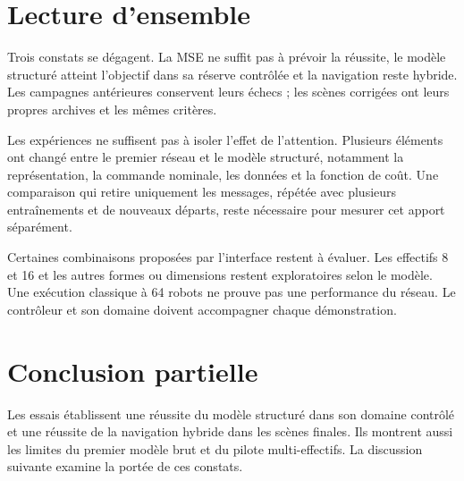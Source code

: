 \section{Lecture d'ensemble}
Trois constats se dégagent. La MSE ne suffit pas à prévoir la réussite, le modèle structuré atteint l'objectif dans sa réserve contrôlée et la navigation reste hybride. Les campagnes antérieures conservent leurs échecs ; les scènes corrigées ont leurs propres archives et les mêmes critères.

Les expériences ne suffisent pas à isoler l'effet de l'attention. Plusieurs éléments ont changé entre le premier réseau et le modèle structuré, notamment la représentation, la commande nominale, les données et la fonction de coût. Une comparaison qui retire uniquement les messages, répétée avec plusieurs entraînements et de nouveaux départs, reste nécessaire pour mesurer cet apport séparément.

Certaines combinaisons proposées par l'interface restent à évaluer. Les effectifs 8 et 16 et les autres formes ou dimensions restent exploratoires selon le modèle. Une exécution classique à 64 robots ne prouve pas une performance du réseau. Le contrôleur et son domaine doivent accompagner chaque démonstration.

\section{Conclusion partielle}
Les essais établissent une réussite du modèle structuré dans son domaine contrôlé et une réussite de la navigation hybride dans les scènes finales. Ils montrent aussi les limites du premier modèle brut et du pilote multi-effectifs. La discussion suivante examine la portée de ces constats.

